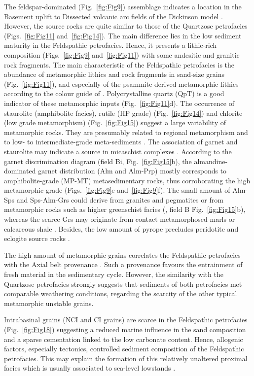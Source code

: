 \documentclass[twoside]{article}
\begin{document}
The feldspar-dominated (Fig.~\ref{fig:Fig9}) assemblage indicates a location in the Basement uplift to Dissected volcanic arc fields of the Dickinson model \citep{Dickinson1985,Dickinson1979a}. However, the source rocks are quite similar to those of the Quartzose petrofacies (Figs.~\ref{fig:Fig11} and~\ref{fig:Fig14}). The main difference lies in the low sediment maturity in the Feldspathic petrofacies. Hence, it presents a lithic-rich composition (Figs.~\ref{fig:Fig9} and~\ref{fig:Fig11}) with some andesitic and granitic rock fragments. The main characteristic of the Feldspathic petrofacies is the abundance of metamorphic lithics and rock fragments in sand-size grains (Fig.~\ref{fig:Fig11}), and especially of the psammite-derived metamorphic lithics according to the colour guide of \citep{Garzanti2003}. Polycrystalline quartz (QpT) is a good indicator of these metamorphic inputs (Fig.~\ref{fig:Fig11}d). The occurrence of staurolite (amphibolite facies), rutile (HP grade) (Fig.~\ref{fig:Fig14}) and chlorite (low grade metamorphism) (Fig.~\ref{fig:Fig15}) suggest a large variability of metamorphic rocks. They are presumably related to regional metamorphism and to low- to intermediate-grade meta-sediments \citep{Eynatten1999,Copjakova2005,Eynatten2012}. The association of garnet and staurolite may indicate a source in micaschist complexes \citep{Fuchtbauer1964}. According to the \citep{Mange2007a} garnet discrimination diagram (field Bi, Fig.~\ref{fig:Fig15}b), the almandine-dominated garnet distribution (Alm and Alm-Prp) mostly corresponds to amphibolite-grade (MP-MT) metasedimentary rocks, thus corroborating the high metamorphic grade (Figs.~\ref{fig:Fig9}e and~\ref{fig:Fig9}f). The small amount of Alm-Sps and Sps-Alm-Grs could derive from granites and pegmatites or from metamorphic rocks such as higher greenschist facies (\citealp{Krippner2014}, field B Fig.~\ref{fig:Fig15}b), whereas the scarce Grs may originate from contact metamorphosed marls or calcareous shale \citep{Win2007}. Besides, the low amount of pyrope precludes peridotite and eclogite source rocks \citep{Eynatten1999}.\par
The high amount of metamorphic grains correlates the Feldspathic petrofacies with the Axial belt provenance \citep{Garzanti2004,Garzanti2007b,Garzanti2010}. Such a provenance favours the entrainment of fresh material in the sedimentary cycle. However, the similarity with the Quartzose petrofacies strongly suggests that sediments of both petrofacies met comparable weathering conditions, regarding the scarcity of the other typical metamorphic unstable grains.\par
Intrabasinal grains (NCI and CI grains) are scarce in the Feldspathic petrofacies (Fig.~\ref{fig:Fig18}) suggesting a reduced marine influence in the sand composition and a sparse cementation linked to the low carbonate content. Hence, allogenic factors, especially tectonics, controlled sediment composition of the Feldspathic petrofacies. This may explain the formation of this relatively unaltered proximal facies which is usually associated to sea-level lowstands \citep{Amorosi2011}.
\end{document}
